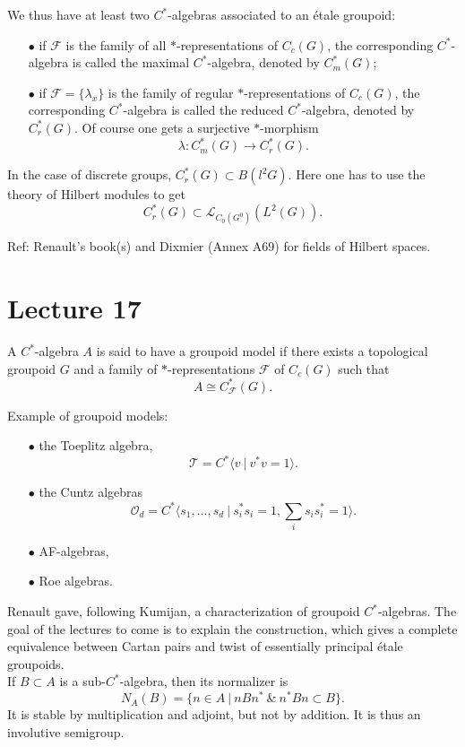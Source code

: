 We thus have at least two $C^*$-algebras associated to an \'etale groupoid:
\begin{itemize}
\item[$\bullet$] if $\mathcal F$ is the family of all $*$-representations of $C_c(G)$, the corresponding $C^*$-algebra is called the maximal $C^*$-algebra, denoted by $C^*_m(G)$;	
\item[$\bullet$] if $\mathcal F=\{\lambda_x\}$ is the family of regular $*$-representations of $C_c(G)$, the corresponding $C^*$-algebra is called the reduced $C^*$-algebra, denoted by $C^*_r(G)$. Of course one gets a surjective $*$-morphism
\[\lambda : C^*_m(G) \rightarrow C^*_r(G).\]
\end{itemize}
In the case of discrete groups, $C_r^*(G)\subset B(l^2 G)$. Here one has to use the theory of Hilbert modules to get 
\[C_r^*(G)\subset \mathcal L_{C_0(G^0)}(L^2(G)).\]

Ref: Renault's book(s) and Dixmier (Annex A69) for fields of Hilbert spaces.

\section{Lecture 17}

A $C^*$-algebra $A$ is said to have a groupoid model if there exists a topological groupoid $G$ and a family of $*$-representations $\mathcal F$ of $C_c(G)$ such that
\[A\cong C^*_{\mathcal F}(G).\]

Example of groupoid models:
\begin{itemize}
\item[$\bullet$] the Toeplitz algebra,
\[\mathcal T = C^*\langle v  \ | \ v^*v = 1 \rangle .\]
\item[$\bullet$] the Cuntz algebras 
\[\mathcal O_d = C^*\langle s_1 , ... , s_d  \ | \ s_i^*s_i= 1 , \sum_i s_i s_i^* =1  \rangle .\]
\item[$\bullet$] AF-algebras,
\item[$\bullet$] Roe algebras.
\end{itemize}

Renault gave, following Kumijan, a characterization of groupoid $C^*$-algebras. The goal of the lectures to come is to explain the construction, which gives a complete equivalence between Cartan pairs and twist of essentially principal \'etale groupoids.\\

If $B\subset A$ is a sub-$C^*$-algebra, then its normalizer is
\[N_A(B) = \{ n \in A \ | \ nBn^* \ \& \ n^*Bn \subset B\}.\]
It is stable by multiplication and adjoint, but not by addition. It is thus an involutive semigroup. \\

